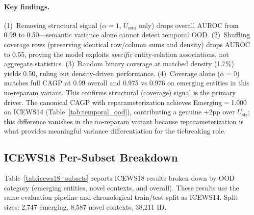 \documentclass{article}
\begin{document}

\paragraph{Key findings.}
(1)~Removing structural signal ($\alpha{=}1$, $U_{\text{sem}}$ only) drops overall AUROC from 0.99 to 0.50---semantic variance alone cannot detect temporal OOD.
(2)~Shuffling coverage rows (preserving identical row/column sums and density) drops AUROC to 0.55, proving the model exploits \emph{specific} entity-relation associations, not aggregate statistics.
(3)~Random binary coverage at matched density (1.7\%) yields 0.50, ruling out density-driven performance.
(4)~Coverage alone ($\alpha{=}0$) matches full CAGP at 0.99 overall and 0.975 vs 0.976 on emerging entities in this no-reparam variant. This confirms structural (coverage) signal is the primary driver. The canonical CAGP with reparameterization achieves Emerging$=$1.000 on ICEWS14 (Table~\ref{tab:temporal_ood}), contributing a genuine +2pp over $U_{\text{str}}$; this difference vanishes in the no-reparam variant because reparameterization is what provides meaningful variance differentiation for the tiebreaking role.

\subsection{ICEWS18 Per-Subset Breakdown}
\label{app:icews18_subsets}

Table~\ref{tab:icews18_subsets} reports ICEWS18 results broken down by OOD category (emerging entities, novel contexts, and overall). These results use the same evaluation pipeline and chronological train/test split as ICEWS14. Split sizes: 2,747 emerging, 8,587 novel contexts, 38,211 ID.
\end{document}
